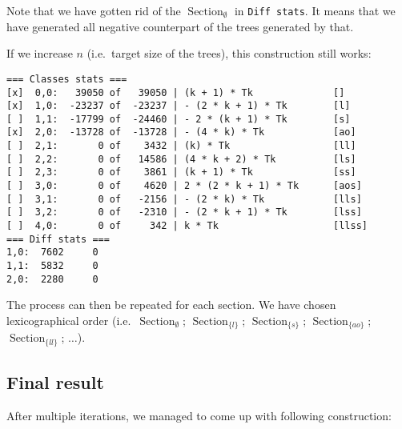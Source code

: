 \documentclass[final]{article}
\theoremstyle{definition}
\theoremstyle{definition}
\theoremstyle{remark}
\DeclareMathOperator{\tSection}{\text{Section}}
\begin{document}
Note that we have gotten rid of the \(\tSection_\emptyset\) in \verb|Diff stats|. It means that we have generated all negative counterpart of the trees generated by that.

If we increase \(n\) (i.e.~target size of the trees), this construction still works:

\begin{lstlisting}
=== Classes stats ===
[x]  0,0:   39050 of   39050 | (k + 1) * Tk              []
[x]  1,0:  -23237 of  -23237 | - (2 * k + 1) * Tk        [l]
[ ]  1,1:  -17799 of  -24460 | - 2 * (k + 1) * Tk        [s]
[x]  2,0:  -13728 of  -13728 | - (4 * k) * Tk            [ao]
[ ]  2,1:       0 of    3432 | (k) * Tk                  [ll]
[ ]  2,2:       0 of   14586 | (4 * k + 2) * Tk          [ls]
[ ]  2,3:       0 of    3861 | (k + 1) * Tk              [ss]
[ ]  3,0:       0 of    4620 | 2 * (2 * k + 1) * Tk      [aos]
[ ]  3,1:       0 of   -2156 | - (2 * k) * Tk            [lls]
[ ]  3,2:       0 of   -2310 | - (2 * k + 1) * Tk        [lss]
[ ]  4,0:       0 of     342 | k * Tk                    [llss]
=== Diff stats ===
1,0:  7602     0
1,1:  5832     0
2,0:  2280     0
\end{lstlisting}

The process can then be repeated for each section. We have chosen lexicographical order (i.e.~\(\tSection_\emptyset\); \(\tSection_{\{l\}}\); \(\tSection_{\{s\}}\); \(\tSection_{\{ao\}}\); \(\tSection_{\{ll\}}\); \(\ldots\)).

\subsection{Final result}%
\label{sub:final_result}

After multiple iterations, we managed to come up with following construction:
\end{document}
